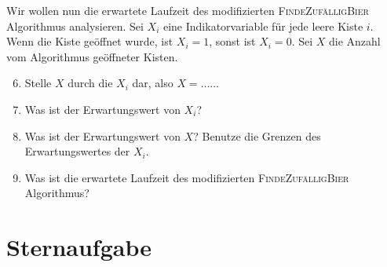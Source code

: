 \documentclass{uebung_cs}
\begin{document}
\begin{aufgabe}[Bierkisten]
	Wir wollen nun die erwartete Laufzeit des modifizierten \textsc{FindeZufälligBier} Algorithmus analysieren. Sei $X_i$ eine Indikatorvariable für jede leere Kiste $i$. Wenn die Kiste geöffnet wurde, ist $X_i = 1$, sonst ist $X_i = 0$. Sei $X$ die Anzahl vom Algorithmus geöffneter Kisten.
		
	\begin{enumerate}
		\setcounter{enumi}{5}
		\item Stelle $X$ durch die $X_i$ dar, also $X = \dots\dots$\\
		\item Was ist der Erwartungswert von $X_i$?\\
		\item Was ist der Erwartungswert von $X$? Benutze die Grenzen des Erwartungswertes der $X_i$.\\
		\item Was ist die erwartete Laufzeit des modifizierten \textsc{FindeZufälligBier} Algorithmus?
	\end{enumerate}
\end{aufgabe}

\section*{Sternaufgabe}

\begin{aufgabe}
	
\end{aufgabe}
\end{document}
